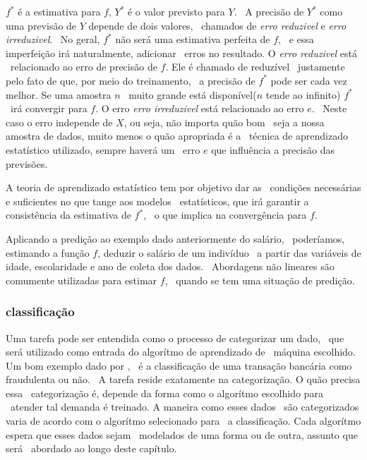 $f^*$ é a estimativa para $f$, $Y^*$ é o valor previsto para $Y$. \
A precisão de $Y^*$ como uma previsão de $Y$ depende de dois valores, \
chamados de \textit{erro reduzivel} e \textit{erro irreduzivel}. \
No geral, $f^*$ não será uma estimativa perfeita de $f$, \
e essa imperfeição irá naturalmente, adicionar \
erros no resultado\cite{Jordan}.  O \textit{erro reduzivel} está \
relacionado ao erro de precisão de $f$. Ele é chamado de reduzível \
justamente pelo fato de que, por meio do treinamento, \
a precisão de $f^*$ pode ser cada vez melhor. Se uma amostra $n$ \
muito grande está disponível($n$ tende ao infinito) $f^*$ \
irá convergir para $f$\cite{Malhotra}.
O erro \textit{erro irreduzivel} está relacionado ao erro $e$. \
Neste caso o erro independe de $X$, ou seja, não importa quão bom \
seja a nossa amostra de dados, muito menos o quão apropriada é a \
técnica de aprendizado estatístico utilizado, sempre haverá um \
erro $e$ que influência a precisão das previsões\cite{Jordan}.

A teoria de aprendizado estatístico tem por objetivo dar as \
condições necessárias e suficientes no que tange aos modelos \
estatísticos, que irá garantir a consistência da estimativa de $f^*$, \
o que implica na convergência para $f$\cite{Malhotra}.

Aplicando a predição ao exemplo dado anteriormente do salário, \
poderíamos, estimando a função $f$, deduzir o salário de um indivíduo \
a partir das variáveis de idade, escolaridade e ano de coleta dos dados. \
Abordagens não lineares são comumente utilizadas para estimar $f$, \
quando se tem uma situação de predição.

\subsubsection{classificação}

Uma tarefa pode ser entendida como o processo de categorizar um dado, \
que será utilizado como entrada do algorítmo de aprendizado de \
máquina escolhido. Um bom exemplo dado por \cite{Jordan}, \
é a classificação de uma transação bancária como fraudulenta ou não. \
A tarefa reside exatamente na categorização. O quão precisa essa \
categorização é, depende da forma como o algorítmo escolhido para \
atender tal demanda é treinado. A maneira como esses dados \
são categorizados varia de acordo com o algorítmo selecionado para \
a classificação. Cada algorítmo espera que esses dados sejam \
modelados de uma forma ou de outra, assunto que será \
abordado ao longo deste capítulo.


